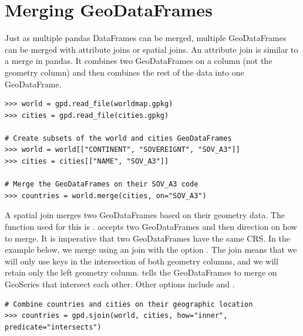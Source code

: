 \section*{Merging GeoDataFrames} %

Just as multiple pandas DataFrames can be merged, multiple GeoDataFrames can be merged with attribute joins or spatial joins.
An attribute join is similar to a merge in pandas.
It combines two GeoDataFrames on a column (not the geometry column) and then combines the rest of the data into one GeoDataFrame.

\begin{lstlisting}
>>> world = gpd.read_file(worldmap.gpkg)
>>> cities = gpd.read_file(cities.gpkg)

# Create subsets of the world and cities GeoDataFrames
>>> world = world[["CONTINENT", "SOVEREIGNT", "SOV_A3"]]
>>> cities = cities[["NAME", "SOV_A3"]]

# Merge the GeoDataFrames on their SOV_A3 code
>>> countries = world.merge(cities, on="SOV_A3")
\end{lstlisting}

A spatial join merges two GeoDataFrames based on their geometry data.
The function used for this is .
 accepts two GeoDataFrames and then direction on how to merge.
It is imperative that two GeoDataFrames have the same CRS.
In the example below, we merge using an  join with the option .
The  join means that we will only use keys in the intersection of both geometry columns, and we will retain only the left geometry column.
 tells the GeoDataFrames to merge on GeoSeries that intersect each other.
Other options include  and .

\begin{lstlisting}
# Combine countries and cities on their geographic location
>>> countries = gpd.sjoin(world, cities, how="inner", predicate="intersects")
\end{lstlisting}

